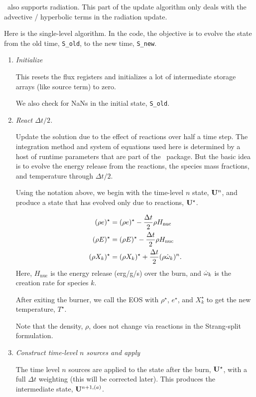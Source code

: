 \castro\ also supports radiation.  This part of the update algorithm
only deals with the advective / hyperbolic terms in the radiation update.

Here is the single-level algorithm.  In the code, the objective is to
evolve the state from the old time, {\tt S\_old}, to the new time,
{\tt S\_new}.  

\begin{enumerate}
\item {\em Initialize}

  This resets the flux registers and initializes a lot of intermediate
  storage arrays (like source term) to zero.

  We also check for NaNs in the initial state, {\tt S\_old}.

\item {\em React $\Delta t/2$.}

  Update the solution due to the effect of reactions over half a time
  step.  The integration method and system of equations used here is
  determined by a host of runtime parameters that are part of the
  \microphysics\ package.  But the basic idea is to evolve the energy
  release from the reactions, the species mass fractions, and
  temperature through $\Delta t/2$.

  Using the notation above, we begin with the time-level $n$ state,
  ${\bf U}^n$, and produce a state that has evolved only due to reactions,
  ${\bf U}^\star$.

  \begin{align}
    (\rho e)^\star &= (\rho e)^\star - \frac{\Delta t}{2} \rho H_\mathrm{nuc} \\
    (\rho E)^\star &= (\rho E)^\star - \frac{\Delta t}{2} \rho H_\mathrm{nuc} \\
    (\rho X_k)^\star &= (\rho X_k)^\star + \frac{\Delta t}{2}(\rho\dot\omega_k)^n.
  \end{align}
  Here, $H_\mathrm{nuc}$ is the energy release (erg/g/s) over the
  burn, and $\dot\omega_k$ is the creation rate for species $k$.

  After exiting the burner, we call the EOS with $\rho^\star$,
  $e^\star$, and $X_k^\star$ to get the new temperature, $T^\star$.

  Note that the density, $\rho$, does not change via reactions in the
  Strang-split formulation.


\item {\em Construct time-level $n$ sources and apply}

  The time level $n$ sources are applied to the state after the burn,
  ${\bf U}^\star$, with a full $\Delta t$ weighting (this will be
  corrected later).  This produces the intermediate state,
  ${\bf U}^{n+1,(a)}$.


\end{enumerate}
